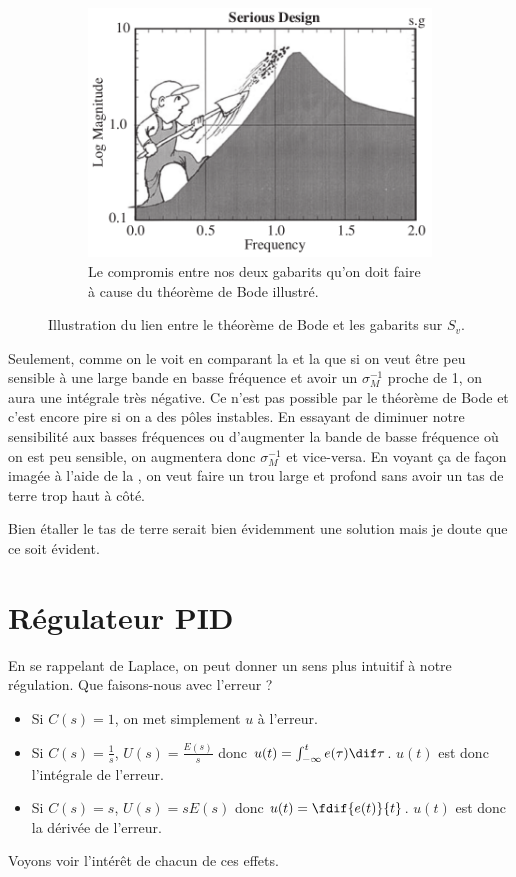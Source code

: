\begin{figure}
\begin{subfigure}{0.3\linewidth}
    \includegraphics[width=\linewidth]{sensitivity-shovel.png}
    \caption{Le compromis entre nos deux gabarits qu'on doit faire
    à cause du théorème de Bode illustré\cite{astrom2010feedback}.}
    \label{fig:sensitivity-shovel}
  \end{subfigure}
  \caption{Illustration du lien entre le théorème de Bode
  et les gabarits sur $S_v$.}
\end{figure}

Seulement, comme on le voit en comparant la  et la 
que si on veut être peu sensible à une large bande en basse fréquence et avoir un $\sigma_M^{-1}$ proche de 1,
on aura une intégrale très négative.
Ce n'est pas possible par le théorème de Bode et c'est encore pire si on a des pôles instables.
En essayant de diminuer notre sensibilité aux basses fréquences ou d'augmenter la bande
de basse fréquence où on est peu sensible, on augmentera donc $\sigma_M^{-1}$
et vice-versa.
En voyant ça de façon imagée à l'aide de la ,
on veut faire un trou large et profond sans avoir un tas de terre trop haut à côté.

Bien étaller le tas de terre serait bien évidemment une solution mais je doute que ce soit évident.

\section{Régulateur PID}
En se rappelant de Laplace, on peut donner un sens plus intuitif à notre régulation.
Que faisons-nous avec l'erreur ?
\begin{itemize}
  \item Si $C(s) = 1$, on met simplement $u$ à l'erreur.
  \item Si $C(s) = \frac{1}{s}$,
    $U(s) = \frac{E(s)}{s}$ donc $u(t) = \int_{-\infty}^t e(\tau) \dif \tau$.
    $u(t)$ est donc l'intégrale de l'erreur.
  \item Si $C(s) = s$,
    $U(s) = sE(s)$ donc $u(t) = \fdif{e(t)}{t}$.
    $u(t)$ est donc la dérivée de l'erreur.
\end{itemize}
Voyons voir l'intérêt de chacun de ces effets.

